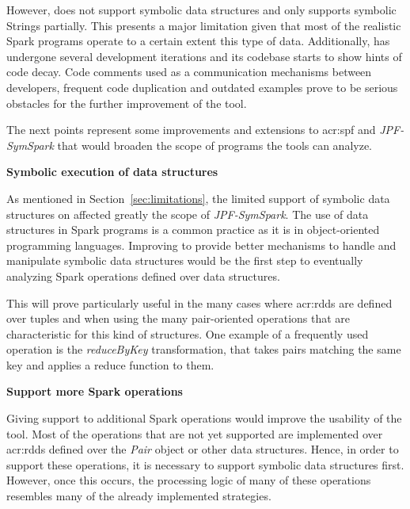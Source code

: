 \begin{enumerate}
	However, \spf{} does not support symbolic data structures and only supports symbolic Strings partially. This presents a major limitation given that most of the realistic Spark programs operate to a certain extent this type of data. Additionally, \spf{} has undergone several development iterations and its codebase starts to show hints of code decay. Code comments used as a communication mechanisms between developers, frequent code duplication and outdated examples prove to be serious obstacles for the further improvement of the tool.
	
\end{enumerate}

\label{sec:future}


The next points represent some improvements and extensions to \acrlong{acr:spf} and \textit{JPF-SymSpark} that would broaden the scope of programs the tools can analyze.

\textbf{Symbolic execution of data structures}

As mentioned in Section~\ref{sec:limitations}, the limited support of symbolic data structures on \spf{} affected greatly the scope of \textit{JPF-SymSpark}. The use of data structures in Spark programs is a common practice as it is in object-oriented programming languages. Improving \spf{} to provide better mechanisms to handle and manipulate symbolic data structures would be the first step to eventually analyzing Spark operations defined over data structures.

This will prove particularly useful in the many cases where \acrshort{acr:rdd}s are defined over tuples and when using the many pair-oriented operations that are characteristic for this kind of structures. One example of a frequently used operation is the \textit{reduceByKey} transformation, that takes pairs matching the same key and applies a reduce function to them.

\textbf{Support more Spark operations}

Giving support to additional Spark operations would improve the usability of the tool. Most of the operations that are not yet supported are implemented over \acrshort{acr:rdd}s defined over the \textit{Pair} object or other data structures. Hence, in order to support these operations, it is necessary to support symbolic data structures first. However, once this occurs, the processing logic of many of these operations resembles many of the already implemented strategies.

